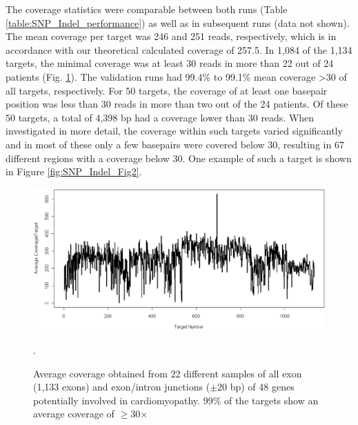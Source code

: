 The coverage statistics were comparable between both runs (Table  \ref{table:SNP_Indel_performance}) as well as in subsequent runs (data not shown). 
The mean coverage per target was 246 and 251 reads, respectively, which is in accordance with our theoretical calculated coverage of 257.5. 
In 1,084 of the 1,134 targets, the minimal coverage was at least 30 reads in more than 22 out of 24 patients (Fig. \ref{fig:SNP_Indel_Fig1}). 
The validation runs had 99.4\% to 99.1\% mean coverage {\textgreater}30 of all targets, respectively. 
For 50 targets, the coverage of at least one basepair position was less than 30 reads in more than two out of the 24 patients. 
Of these 50 targets, a total of 4,398 bp had a coverage lower than 30 reads. 
When investigated in more detail, the coverage within such targets varied significantly and in most of these only a few basepairs were covered below 30, resulting in 67 different regions with a coverage below 30. 
One example of such a target is shown in Figure \ref{fig:SNP_Indel_Fig2}.

\begin{figure}
	\includegraphics[width=1.0\linewidth]{img/SNP_Indel_Fig1}
	\caption[Average coverage per exon cardiomyopathy 48 gene panel]{Average coverage obtained from 22 different samples of all exon (1,133 exons) and exon/intron junctions ({$\pm$}20 bp) of 48 genes potentially involved in cardiomyopathy. 99\% of the targets show an average coverage of $\ge$30$\times$}.
	\label{fig:SNP_Indel_Fig1}
\end{figure}

